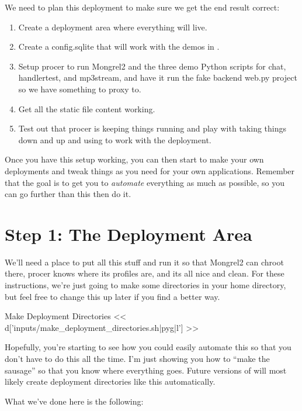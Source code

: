 We need to plan this deployment to make sure we get the end result correct:

\begin{enumerate}
\item Create a deployment area where everything will live.
\item Create a config.sqlite that will work with the demos in .
\item Setup procer to run Mongrel2 and the three demo Python scripts for chat, handlertest, and mp3stream,
    and have it run the fake backend web.py project so we have something to proxy to.
\item Get all the static file content working.
\item Test out that procer is keeping things running and play with taking things down and up and using
     to work with the deployment.
\end{enumerate}

Once you have this setup working, you can then start to make your own
deployments and tweak things as you need for your own applications.  Remember
that the goal is to get you to \emph{automate} everything as much as possible,
so you can go further than this then do it.

\section{Step 1: The Deployment Area}

We'll need a place to put all this stuff and run it so that Mongrel2 can chroot
there, procer knows where its profiles are, and its all nice and clean.  For these
instructions, we're just going to make some directories in your home directory,
but feel free to change this up later if you find a better way.

\begin{code}{Make Deployment Directories}
<< d['inputs/make_deployment_directories.sh|pyg|l'] >>
\end{code}

Hopefully, you're starting to see how you could easily automate this so that you don't
have to do this all the time.  I'm just showing you how to ``make the sausage'' so that
you know where everything goes.  Future versions of  will most likely
create deployment directories like this automatically.

What we've done here is the following:

